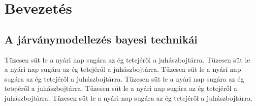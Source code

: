 \chapter{Bevezetés}
\label{ch:intro}

\section{A járványmodellezés bayesi technikái}

Tüzesen süt le a nyári nap sugára az ég tetejéről a juhászbojtárra. Tüzesen süt le a nyári nap sugára az ég tetejéről a juhászbojtárra. Tüzesen süt le a nyári nap sugára az ég tetejéről a juhászbojtárra. Tüzesen süt le a nyári nap sugára az ég tetejéről a juhászbojtárra. Tüzesen süt le a nyári nap sugára az ég tetejéről a juhászbojtárra. Tüzesen süt le a nyári nap sugára az ég tetejéről a juhászbojtárra.